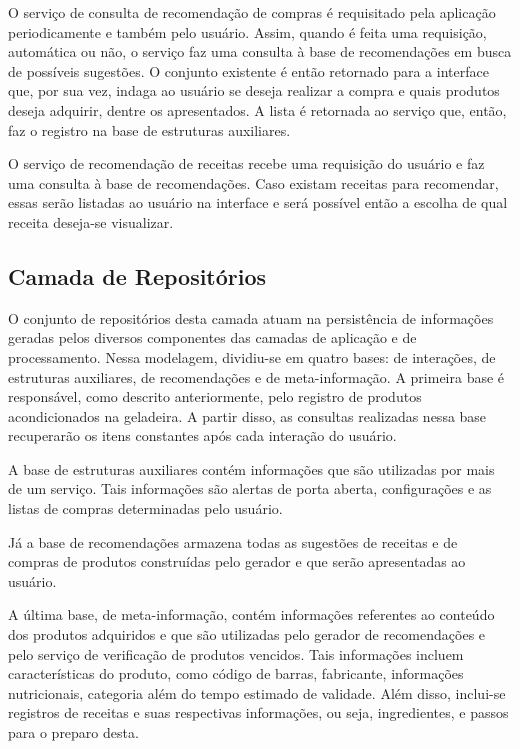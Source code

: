 
O serviço de consulta de recomendação de compras é requisitado pela aplicação periodicamente e também pelo usuário. Assim, quando é feita uma requisição, automática ou não, o serviço faz uma consulta à base de recomendações em busca de possíveis sugestões. O conjunto existente é então retornado para a interface que, por sua vez, indaga ao usuário se deseja realizar a compra e quais produtos deseja adquirir, dentre os apresentados. A lista é retornada ao serviço que, então, faz o registro na base de estruturas auxiliares.


O serviço de recomendação de receitas recebe uma requisição do usuário e faz uma consulta à base de recomendações. Caso existam receitas para recomendar, essas serão listadas ao usuário na interface e será possível então a escolha de qual receita deseja-se visualizar.


\subsection{Camada de Repositórios} \label{sec:camada-repo}

O conjunto de repositórios desta camada atuam na persistência de informações geradas pelos diversos componentes das camadas de aplicação e de processamento. Nessa modelagem, dividiu-se em quatro bases: de interações, de estruturas auxiliares, de recomendações e de meta-informação.
A primeira base é responsável, como descrito anteriormente, pelo registro de produtos acondicionados na geladeira. A partir disso, as consultas realizadas nessa base recuperarão os itens constantes após cada interação do usuário.

A base de estruturas auxiliares contém informações que são utilizadas por mais de um serviço. Tais informações são alertas de porta aberta, configurações e as listas de compras determinadas pelo usuário. 

Já a base de recomendações armazena todas as sugestões de receitas e de compras de produtos construídas pelo gerador e que serão apresentadas ao usuário.

A última base, de meta-informação, contém informações referentes ao conteúdo dos produtos adquiridos e que são utilizadas pelo gerador de recomendações e pelo serviço de verificação de produtos vencidos. Tais informações incluem características do produto, como código de barras, fabricante, informações nutricionais, categoria além do tempo estimado de validade. Além disso, inclui-se registros de receitas e suas respectivas informações, ou seja, ingredientes, e passos para o preparo desta.

